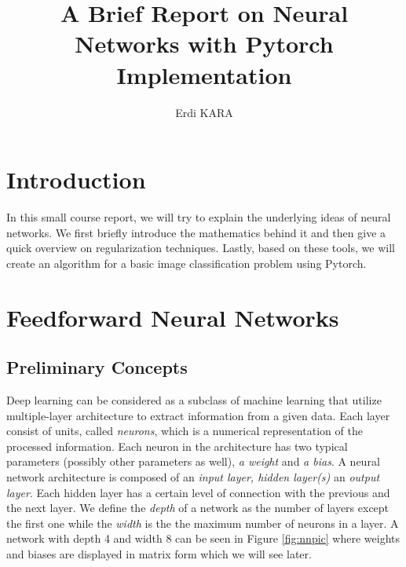 \documentclass[12pt]{article}
\begin{document}
 
 
\title{A  Brief Report on Neural Networks with Pytorch Implementation}
\author{Erdi KARA}
\date{}
\maketitle
 
\section*{Introduction}

	
	In this small course report, we will try to explain the underlying ideas of neural networks. We first briefly introduce the mathematics behind it and then give a quick overview on regularization techniques. Lastly, based on these tools, we will create an algorithm for a basic image classification problem using Pytorch. \cite{torch}



\section{ Feedforward Neural Networks}
\subsection{Preliminary Concepts}
\label{PC}

Deep learning can be considered as a subclass of machine learning that utilize multiple-layer architecture to extract information from a given data. Each layer consist of units, called \textit{neurons}, which is a numerical representation of the processed information. Each neuron in the architecture has two typical parameters (possibly other parameters as well), \textit{a weight} and \textit{a bias}. A neural network architecture is composed of an \textit{ input layer, hidden layer(s) } an \textit{output layer}. Each hidden layer has a certain level of connection with the previous and the next layer.  We define the \textit{depth} of a network  as the number of layers except the first one while the \textit{width} is the the maximum number of neurons in a layer. A network with depth 4 and width 8 can be seen in Figure \ref{fig:nnpic} where weights and biases are displayed in matrix form which we will see later.
\end{document}
